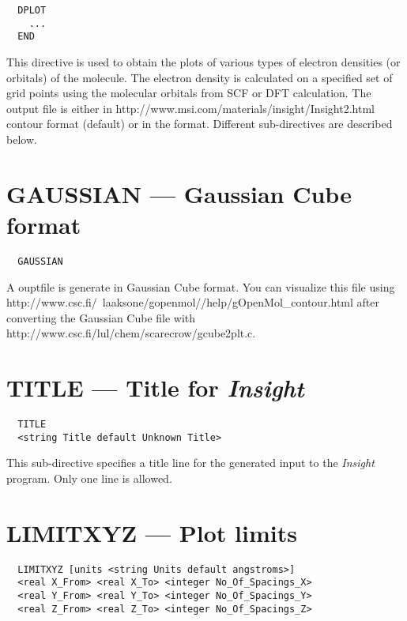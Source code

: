 \label{sec:dplot}
\begin{verbatim}
  DPLOT
    ...
  END
\end{verbatim}

This directive is used to obtain the plots of various types of electron
densities (or orbitals) of the molecule. The electron density is calculated
on a specified set of grid points using the molecular orbitals
from SCF or DFT calculation. The output file is either in 
{http://www.msi.com/materials/insight/Insight2.html} contour format
(default)
 or in the 
format. 
Different sub-directives are described below.

\section{GAUSSIAN --- Gaussian Cube format}

\begin{verbatim}
  GAUSSIAN
\end{verbatim}

A ouptfile is generate in Gaussian Cube format.
You can visualize this file using  
{http://www.csc.fi/~laaksone/gopenmol//help/gOpenMol_contour.html}
after converting the Gaussian Cube file with 
{http://www.csc.fi/lul/chem/scarecrow/gcube2plt.c}.

\section{TITLE --- Title for {\em Insight}}

\begin{verbatim}
  TITLE
  <string Title default Unknown Title>
\end{verbatim}

This sub-directive specifies a title line for the generated
input to the {\em Insight} program. Only one line is allowed.

\section{LIMITXYZ --- Plot limits}

\begin{verbatim}
  LIMITXYZ [units <string Units default angstroms>]
  <real X_From> <real X_To> <integer No_Of_Spacings_X>
  <real Y_From> <real Y_To> <integer No_Of_Spacings_Y>
  <real Z_From> <real Z_To> <integer No_Of_Spacings_Z>
\end{verbatim}

